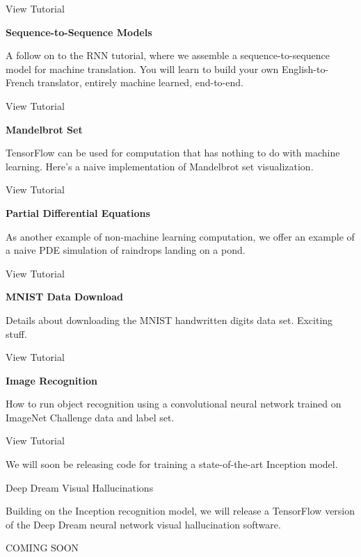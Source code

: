 View Tutorial

\textbf{Sequence-to-Sequence Models}

A follow on to the RNN tutorial, where we assemble a sequence-to-sequence model for machine translation. You will learn to build your own English-to-French translator, entirely machine learned, end-to-end.

View Tutorial

\textbf{Mandelbrot Set}

TensorFlow can be used for computation that has nothing to do with machine learning. Here's a naive implementation of Mandelbrot set visualization.

View Tutorial

\textbf{Partial Differential Equations}

As another example of non-machine learning computation, we offer an example of a naive PDE simulation of raindrops landing on a pond.

View Tutorial

\textbf{MNIST Data Download}

Details about downloading the MNIST handwritten digits data set. Exciting stuff.

View Tutorial

\textbf{Image Recognition}

How to run object recognition using a convolutional neural network trained on ImageNet Challenge data and label set.

View Tutorial

We will soon be releasing code for training a state-of-the-art Inception model.

Deep Dream Visual Hallucinations

Building on the Inception recognition model, we will release a TensorFlow version of the Deep Dream neural network visual hallucination software.

COMING SOON